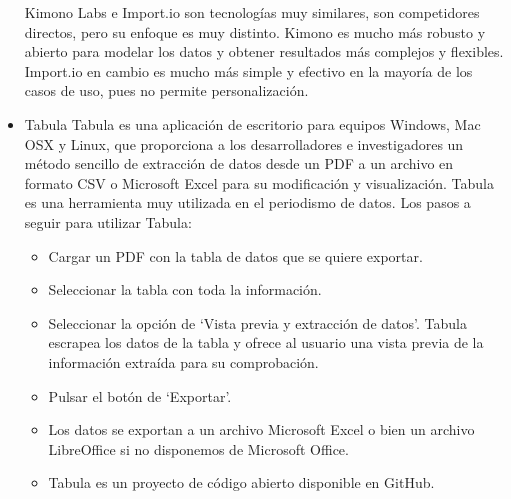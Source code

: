 \documentclass[twoside,twocolumn]{article}
\begin{document}
\begin{itemize}
\newline
\newline
Kimono Labs e Import.io son tecnologías muy similares, son competidores directos, pero su enfoque es muy distinto. Kimono es mucho más robusto y abierto para modelar los datos y obtener resultados más complejos y flexibles. Import.io en cambio es mucho más simple y efectivo en la mayoría de los casos de uso, pues no permite personalización. 
\newline
\newline
\item Tabula 
\newline
Tabula es una aplicación de escritorio para equipos Windows, Mac OSX y Linux, que proporciona a los desarrolladores e investigadores un método sencillo de extracción de datos desde un PDF a un archivo en formato CSV o Microsoft Excel para su modificación y visualización. Tabula es una herramienta muy utilizada en el periodismo de datos. 
\newline
\newline
Los pasos a seguir para utilizar Tabula:
\begin{itemize}
\item Cargar un PDF con la tabla de datos que se quiere exportar. 
\newline
\newline
\item Seleccionar la tabla con toda la información.
\newline
\newline
\item Seleccionar la opción de ‘Vista previa y extracción de datos’. Tabula escrapea los datos de la tabla y ofrece al usuario una vista previa de la información extraída para su comprobación.
\newline
\newline
\item  Pulsar el botón de ‘Exportar’.
\newline
\newline
\item Los datos se exportan a un archivo Microsoft Excel o bien un archivo LibreOffice si no disponemos de Microsoft Office.
\newline
\newline
\item  Tabula es un proyecto de código abierto disponible en GitHub.
\newline
\newline
\end{itemize}



\end{itemize}
\end{document}

